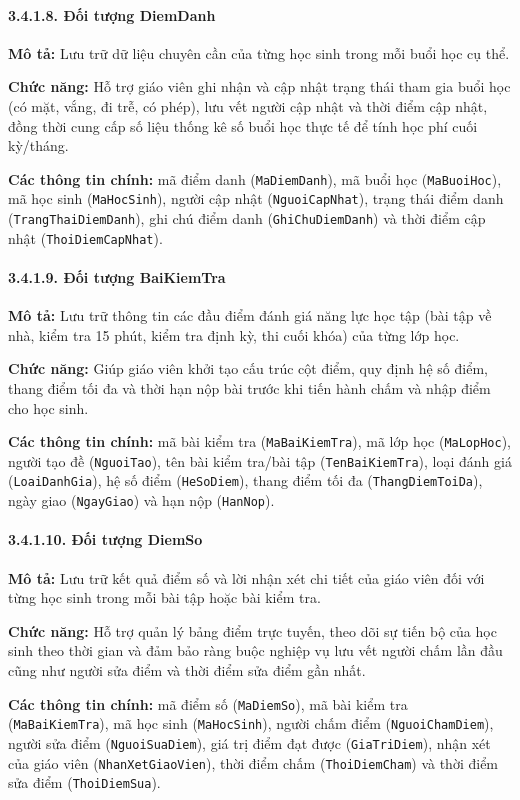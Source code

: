 \paragraph{3.4.1.8. Đối tượng DiemDanh}\mbox{}\par
\textbf{Mô tả:} Lưu trữ dữ liệu chuyên cần của từng học sinh trong mỗi buổi học cụ thể.\par
\textbf{Chức năng:} Hỗ trợ giáo viên ghi nhận và cập nhật trạng thái tham gia buổi học (có mặt, vắng, đi trễ, có phép), lưu vết người cập nhật và thời điểm cập nhật, đồng thời cung cấp số liệu thống kê số buổi học thực tế để tính học phí cuối kỳ/tháng.\par
\textbf{Các thông tin chính:} mã điểm danh (\texttt{MaDiemDanh}), mã buổi học (\texttt{MaBuoiHoc}), mã học sinh (\texttt{MaHocSinh}), người cập nhật (\texttt{NguoiCapNhat}), trạng thái điểm danh (\texttt{TrangThaiDiemDanh}), ghi chú điểm danh (\texttt{GhiChuDiemDanh}) và thời điểm cập nhật (\texttt{ThoiDiemCapNhat}).

\paragraph{3.4.1.9. Đối tượng BaiKiemTra}\mbox{}\par
\textbf{Mô tả:} Lưu trữ thông tin các đầu điểm đánh giá năng lực học tập (bài tập về nhà, kiểm tra 15 phút, kiểm tra định kỳ, thi cuối khóa) của từng lớp học.\par
\textbf{Chức năng:} Giúp giáo viên khởi tạo cấu trúc cột điểm, quy định hệ số điểm, thang điểm tối đa và thời hạn nộp bài trước khi tiến hành chấm và nhập điểm cho học sinh.\par
\textbf{Các thông tin chính:} mã bài kiểm tra (\texttt{MaBaiKiemTra}), mã lớp học (\texttt{MaLopHoc}), người tạo đề (\texttt{NguoiTao}), tên bài kiểm tra/bài tập (\texttt{TenBaiKiemTra}), loại đánh giá (\texttt{LoaiDanhGia}), hệ số điểm (\texttt{HeSoDiem}), thang điểm tối đa (\texttt{ThangDiemToiDa}), ngày giao (\texttt{NgayGiao}) và hạn nộp (\texttt{HanNop}).

\paragraph{3.4.1.10. Đối tượng DiemSo}\mbox{}\par
\textbf{Mô tả:} Lưu trữ kết quả điểm số và lời nhận xét chi tiết của giáo viên đối với từng học sinh trong mỗi bài tập hoặc bài kiểm tra.\par
\textbf{Chức năng:} Hỗ trợ quản lý bảng điểm trực tuyến, theo dõi sự tiến bộ của học sinh theo thời gian và đảm bảo ràng buộc nghiệp vụ lưu vết người chấm lần đầu cũng như người sửa điểm và thời điểm sửa điểm gần nhất.\par
\textbf{Các thông tin chính:} mã điểm số (\texttt{MaDiemSo}), mã bài kiểm tra (\texttt{MaBaiKiemTra}), mã học sinh (\texttt{MaHocSinh}), người chấm điểm (\texttt{NguoiChamDiem}), người sửa điểm (\texttt{NguoiSuaDiem}), giá trị điểm đạt được (\texttt{GiaTriDiem}), nhận xét của giáo viên (\texttt{NhanXetGiaoVien}), thời điểm chấm (\texttt{ThoiDiemCham}) và thời điểm sửa điểm (\texttt{ThoiDiemSua}).

